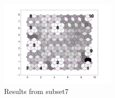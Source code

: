 \begin{figure}
        \centering
        \includegraphics[width=0.5\textwidth]{../../images0.01/M31/2D/image_subsets/subset7_dist_with_hits_t.png}
    \caption{Results from subset7}
    \label{fig: subset7}
\end{figure}